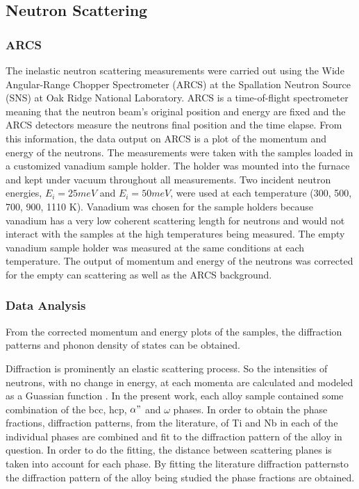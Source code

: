 \subsection{Neutron Scattering}

\subsubsection{ARCS}

The inelastic neutron scattering measurements were carried out using the Wide Angular-Range Chopper Spectrometer (ARCS) at the Spallation Neutron Source (SNS) at Oak Ridge National Laboratory. ARCS is a time-of-flight spectrometer meaning that the neutron beam's original position and energy are fixed and the ARCS detectors measure the neutrons final position and the time elapse. From this information, the data output on ARCS is a plot of the momentum and energy of the neutrons. The measurements were taken with the samples loaded in a customized vanadium sample holder. The holder was mounted into the furnace and kept under vacuum throughout all measurements. Two incident neutron energies, $E_{i} = 25 meV$ and $E_{i} = 50 meV$, were used at each temperature (300, 500, 700, 900, 1110 K). Vanadium was chosen for the sample holders because vanadium has a very low coherent scattering length for neutrons and would not interact with the samples at the high temperatures being measured. The empty vanadium sample holder was measured at the same conditions at each temperature. The output of momentum and energy of the neutrons was corrected for the empty can scattering as well as the ARCS background. 

\subsubsection{Data Analysis}

From the corrected momentum and energy plots of the samples, the diffraction patterns and phonon density of states can be obtained.

Diffraction is prominently an elastic scattering process. So the intensities of neutrons, with no change in energy, at each momenta are calculated and modeled as a Guassian function \cite{Young1998,Toraya1986}. In the present work, each alloy sample contained some combination of the bcc, hcp, $\alpha"$ and $\omega$ phases. In order to obtain the phase fractions, diffraction patterns, from the literature, of Ti and Nb in each of the individual phases are combined and fit to the diffraction pattern of the alloy in question. In order to do the fitting, the distance between scattering planes is taken into account for each phase. By fitting the literature diffraction patternsto the diffraction pattern of the alloy being studied the phase fractions are obtained. 

